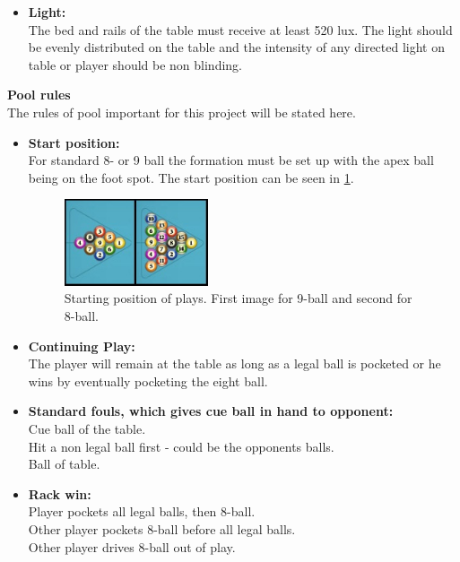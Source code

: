 \begin{itemize}
		
	\item \textbf{Light:}\\
		The bed and rails of the table must receive at least 520 lux. The light should be evenly distributed on the table and the intensity of any directed light on table or player should be non blinding.
\end{itemize}

\textbf{Pool rules}\\
The rules of pool important for this project will be stated here.

\begin{itemize}
	\item \textbf{Start position:}\\
		For standard 8- or 9 ball the formation must be set up with the apex ball being on the foot spot. The start position can be seen in \ref{fig:poolstart}.\\
		
\begin{figure}[H]
\begin{center}
\leavevmode
\includegraphics[width=0.4\textwidth]{images/poolstart.jpg}
\end{center}
\caption{Starting position of plays. First image for 9-ball and second for 8-ball.}
\label{fig:poolstart}
\end{figure}

	\item \textbf{Continuing Play:}\\
		The player will remain at the table as long as a legal ball is pocketed or he wins by eventually pocketing the eight ball.\\
		
	\item \textbf{Standard fouls, which gives cue ball in hand to opponent:}\\
		Cue ball of the table.\\
		Hit a non legal ball first - could be the opponents balls.\\
		Ball of table.\\
		
	\item \textbf{Rack win:}\\
		Player pockets all legal balls, then 8-ball.\\
		Other player pockets 8-ball before all legal balls.\\
		Other player drives 8-ball out of play.\\
\end{itemize}

